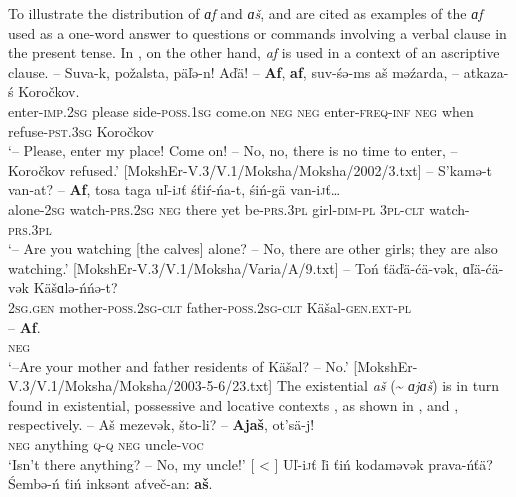 \documentclass[output=paper]{langsci/langscibook}
\begin{document}
  To illustrate the distribution of \textit{ɑf} and \textit{ɑš},  and  are cited as examples of the \textit{ɑf} used as a one-word answer to questions or commands involving a verbal clause in the present tense. In , on the other hand, \textit{af} is used in a context of an ascriptive clause. 
\ea\label{ex:moksha-Korochkov}
\gll -- Suva-k, požalsta, päľə-n! Aďä! -- \textbf{Af}, \textbf{af}, suv-śə-ms aš məźarda, -- atkaza-ś Koročkov.\\
{} enter-\textsc{imp.2sg} please side-\textsc{poss.1sg} come.on {} \textsc{neg} \textsc{neg} enter-\textsc{freq-inf}  \textsc{neg} when {} refuse-\textsc{pst.3sg} Koročkov\\
\glt `-- Please, enter my place! Come on! -- No, no, there is no time to enter, -- Koročkov refused.' [MokshEr-V.3/V.1/Moksha/Moksha/2002/3.txt]
\z 
\ea\label{ex:moksha-watching}
\gll -- S’kamə-t van-at? -- \textbf{Af}, tosa taga uľ-i\textsc{j}ť śťiŕ-ńa-t, śiń-gä van-i\textsc{j}ť\ldots\\
{} alone-\textsc{2sg} watch-\textsc{prs.2sg} {} \textsc{neg} there yet be-\textsc{prs.3pl} girl-\textsc{dim-pl} \textsc{3pl-clt} watch-\textsc{prs.3pl}\\
\glt `-- Are you watching [the calves] alone? -- No, there are other girls; they are also watching.' [MokshEr-V.3/V.1/Moksha/Varia/A/9.txt]
\z
\ea\label{ex:moksha-residents}
\gll -- Toń ťäďä-ćä-vək, ɑľä-ćä-vək Käšɑlə-ńńə-t?\\
{} \textsc{2sg.gen} mother-\textsc{poss.2sg-clt} father-\textsc{poss.2sg-clt} Käšal-\textsc{gen.ext-pl}\\
\sn
\gll -- \textbf{Af}.\\
{} \textsc{neg}\\
\glt `--Are your mother and father residents of Käšal? -- No.' [MokshEr-V.3/V.1/Moksha/Moksha/2003-5-6/23.txt]
\z
The existential \textit{aš} (\textasciitilde{} \textit{ɑjɑš}) is in turn found in existential, possessive and locative contexts \citep[270]{Hamari2007}, as shown in ,  and , respectively. 
\ea\label{ex:moksha-uncle}
\gll -- Aš mezevək, što-li? -- \textbf{Ajaš}, ot’sä-j!\\
{} \textsc{neg} anything \textsc{q-q} {} \textsc{neg} uncle-\textsc{voc}\\
\glt `Isn't there anything? -- No, my uncle!' [\citealt[270]{Hamari2007} < \citealt[888]{PaasonenRavila1947}]
\z
\ea\label{ex:moksha-right}
\gll Uľ-i\textsc{j}ť ľi ťiń kodaməvək prava-ńťä? Śembə-ń ťiń inksənt aťveč-an: \textbf{aš}.\\
\end{document}
